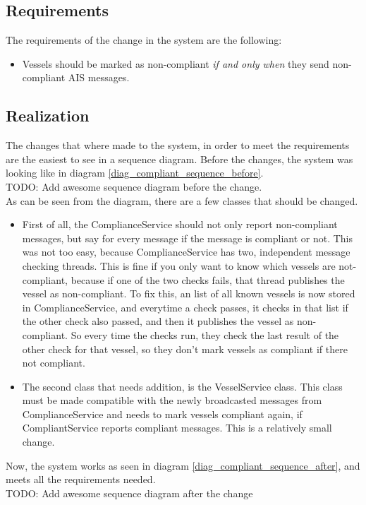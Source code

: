\documentclass[12pt]{article}
\begin{document}
\subsection*{Requirements}
The requirements of the change in the system are the following:
\begin{itemize}
\item Vessels should be marked as non-compliant \emph{if and only when} they send non-compliant AIS messages.
\end{itemize}

\subsection*{Realization}
The changes that where made to the system, in order to meet the requirements are the easiest to see in a sequence diagram. Before the changes, the system was looking like in diagram \ref{diag_compliant_sequence_before}.
\\
TODO: Add awesome sequence diagram before the change.
\\
As can be seen from the diagram, there are a few classes that should be changed.
\begin{itemize}
\item First of all, the ComplianceService should not only report non-compliant messages, but say for every message if the message is compliant or not. This was not too easy, because ComplianceService has two, independent message checking threads. This is fine if you only want to know which vessels are not-compliant, because if one of the two checks fails, that thread publishes the vessel as non-compliant. To fix this, an list of all known vessels is now stored in ComplianceService, and everytime a check passes, it checks in that list if the other check also passed, and then it publishes the vessel as non-compliant. So every time the checks run, they check the last result of the other check for that vessel, so they don't mark vessels as compliant if there not compliant.
\item The second class that needs addition, is the VesselService class. This class must be made compatible with the newly broadcasted messages from ComplianceService and needs to mark vessels compliant again, if CompliantService reports compliant messages. This is a relatively small change.
\end{itemize}

Now, the system works as seen in diagram \ref{diag_compliant_sequence_after}, and meets all the requirements needed.
\\
TODO: Add awesome sequence diagram after the change
\end{document}
